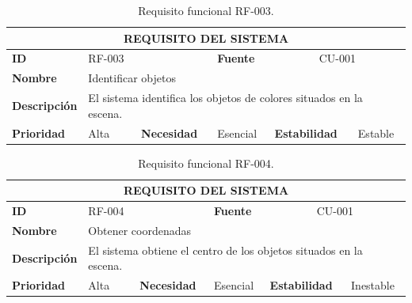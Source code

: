 \begin{table}[H]
	\centering
	\begin{tabular}{|p{2cm} | p{1.5cm} | p{2cm} | p{1.7cm} | p{2cm} | p{2cm} |}
		\hline
		\multicolumn{6}{|c|}{\textbf{REQUISITO DEL SISTEMA}} \\ 
		\hline
		\textbf{ID} & RF-003 & & \textbf{Fuente} & \multicolumn{2}{c|}{CU-001} \\
		\hline
		\textbf{Nombre} & \multicolumn{5}{l|}{Identificar objetos} \\
		\hline
		\textbf{Descripción} & \multicolumn{5}{l|}{El sistema identifica los objetos de colores situados en la escena.} \\
		\hline
		\textbf{Prioridad} & Alta & \textbf{Necesidad} & Esencial & \textbf{Estabilidad} & Estable \\
		\hline		
	\end{tabular}
	\caption{Requisito funcional RF-003.}
	\label{cuad:RF-003}
\end{table}

\begin{table}[H]
	\centering
	\begin{tabular}{|p{2cm} | p{1.5cm} | p{2cm} | p{1.7cm} | p{2cm} | p{2cm} |}
		\hline
		\multicolumn{6}{|c|}{\textbf{REQUISITO DEL SISTEMA}} \\ 
		\hline
		\textbf{ID} & RF-004 & & \textbf{Fuente} & \multicolumn{2}{c|}{CU-001} \\
		\hline
		\textbf{Nombre} & \multicolumn{5}{l|}{Obtener coordenadas} \\
		\hline
		\textbf{Descripción} & \multicolumn{5}{l|}{\parbox{30em}{El sistema obtiene el centro de los objetos situados en la escena.}} \\
		\hline
		\textbf{Prioridad} & Alta & \textbf{Necesidad} & Esencial & \textbf{Estabilidad} & Inestable \\
		\hline		
	\end{tabular}
	\caption{Requisito funcional RF-004.}
	\label{cuad:RF-004}
\end{table}

